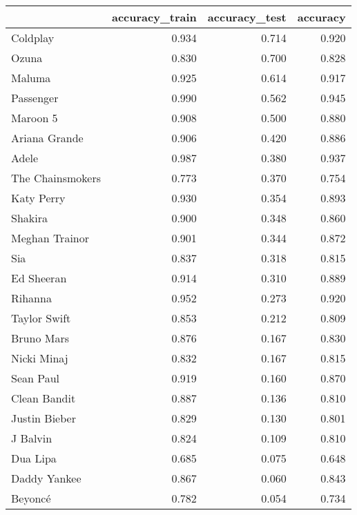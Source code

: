 \begin{tabular}{lrrr}
\toprule
{} &  accuracy\_train &  accuracy\_test &  accuracy \\
\midrule
Coldplay         &           0.934 &          0.714 &     0.920 \\
Ozuna            &           0.830 &          0.700 &     0.828 \\
Maluma           &           0.925 &          0.614 &     0.917 \\
Passenger        &           0.990 &          0.562 &     0.945 \\
Maroon 5         &           0.908 &          0.500 &     0.880 \\
Ariana Grande    &           0.906 &          0.420 &     0.886 \\
Adele            &           0.987 &          0.380 &     0.937 \\
The Chainsmokers &           0.773 &          0.370 &     0.754 \\
Katy Perry       &           0.930 &          0.354 &     0.893 \\
Shakira          &           0.900 &          0.348 &     0.860 \\
Meghan Trainor   &           0.901 &          0.344 &     0.872 \\
Sia              &           0.837 &          0.318 &     0.815 \\
Ed Sheeran       &           0.914 &          0.310 &     0.889 \\
Rihanna          &           0.952 &          0.273 &     0.920 \\
Taylor Swift     &           0.853 &          0.212 &     0.809 \\
Bruno Mars       &           0.876 &          0.167 &     0.830 \\
Nicki Minaj      &           0.832 &          0.167 &     0.815 \\
Sean Paul        &           0.919 &          0.160 &     0.870 \\
Clean Bandit     &           0.887 &          0.136 &     0.810 \\
Justin Bieber    &           0.829 &          0.130 &     0.801 \\
J Balvin         &           0.824 &          0.109 &     0.810 \\
Dua Lipa         &           0.685 &          0.075 &     0.648 \\
Daddy Yankee     &           0.867 &          0.060 &     0.843 \\
Beyoncé          &           0.782 &          0.054 &     0.734 \\
\bottomrule
\end{tabular}
